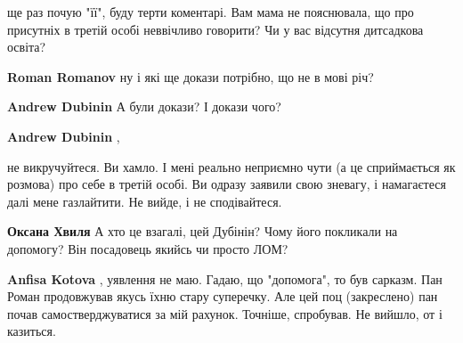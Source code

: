 \begin{itemize}
\begin{itemize}
ще раз почую "її", буду терти коментарі. Вам мама не пояснювала, що про
присутніх в третій особі неввічливо говорити? Чи у вас відсутня дитсадкова
освіта?


 
\textbf{Roman Romanov} ну і які ще докази потрібно, що не в мові річ?

 
\textbf{Andrew Dubinin} А були докази? І докази чого?

 
\textbf{Andrew Dubinin} , 

не викручуйтеся. Ви хамло. І мені реально неприємно чути (а це сприймається як
розмова) про себе в третій особі. Ви одразу заявили свою зневагу, і намагаєтеся
далі мене газлайтити. Не вийде, і не сподівайтеся.

 
\textbf{Оксана Хвиля} А хто це взагалі, цей Дубінін? Чому його покликали на допомогу? Він посадовець якийсь чи просто ЛОМ?

 
\textbf{Anfisa Kotova} , уявлення не маю. Гадаю, що "допомога", то був сарказм.
Пан Роман продовжував якусь їхню стару суперечку. Але цей поц (закреслено) пан
почав самостверджуватися за мій рахунок. Точніше, спробував. Не вийшло, от і
казиться.


\end{itemize}
\end{itemize}

